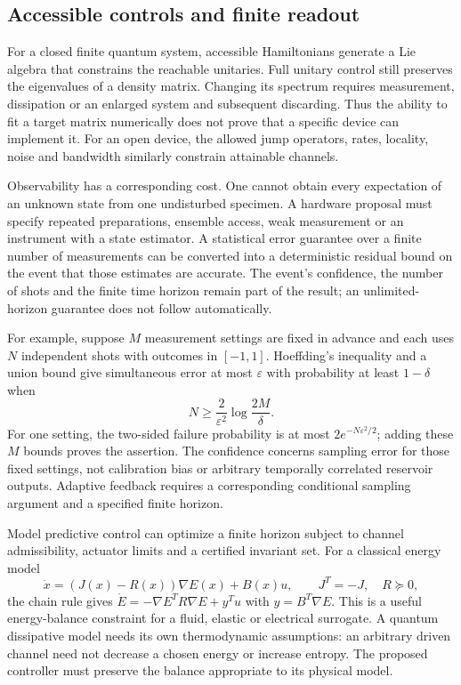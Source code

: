 \subsection{Accessible controls and finite readout}

For a closed finite quantum system, accessible Hamiltonians generate a Lie
algebra that constrains the reachable unitaries. Full unitary control still
preserves the eigenvalues of a density matrix. Changing its spectrum
requires measurement, dissipation or an enlarged system and subsequent
discarding. Thus the ability to fit a target matrix numerically does not
prove that a specific device can implement it.\cite{qtsAlbertiniDAlessandro2003}
For an open device, the allowed jump operators, rates, locality, noise and
bandwidth similarly constrain attainable channels.

Observability has a corresponding cost. One cannot obtain every expectation
of an unknown state from one undisturbed specimen. A hardware proposal must
specify repeated preparations, ensemble access, weak measurement or an
instrument with a state estimator. A statistical error guarantee over a
finite number of measurements can be converted into a deterministic
residual bound on the event that those estimates are accurate. The event's
confidence, the number of shots and the finite time horizon remain part of
the result; an unlimited-horizon guarantee does not follow automatically.

For example, suppose $M$ measurement settings are fixed in advance and
each uses $N$ independent shots with outcomes in $[-1,1]$. Hoeffding's
inequality and a union bound give simultaneous error at most $\varepsilon$
with probability at least $1-\delta$ when
\[
 N\ge\frac{2}{\varepsilon^2}\log\frac{2M}{\delta}.
\]
For one setting, the two-sided failure probability is at most
$2e^{-N\varepsilon^2/2}$; adding these $M$ bounds proves the assertion.
The confidence concerns sampling error for those fixed settings, not
calibration bias or arbitrary temporally correlated reservoir outputs.
Adaptive feedback requires a corresponding conditional sampling argument
and a specified finite horizon.\cite{qtsHoeffding1963}

Model predictive control can optimize a finite horizon subject to channel
admissibility, actuator limits and a certified invariant set. For a
classical energy model
\[
 \dot x=(J(x)-R(x))\nabla E(x)+B(x)u,\qquad
 J^T=-J,\quad R\succeq0,
\]
the chain rule gives
$\dot E=-\nabla E^TR\nabla E+y^Tu$ with
$y=B^T\nabla E$. This is a useful energy-balance constraint for a
fluid, elastic or electrical surrogate. A quantum dissipative model needs
its own thermodynamic assumptions: an arbitrary driven channel need not
decrease a chosen energy or increase entropy. The proposed controller
must preserve the balance appropriate to its physical model.

